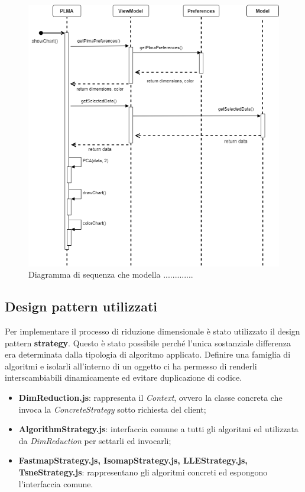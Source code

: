 \newpage
\begin{figure}[hb]
\includegraphics[width=15.5cm]{Extra/Allegato Tecnico-Sequenza-PLMA}
\centering
\caption{Diagramma di sequenza che modella .............}
\end{figure}
\newpage

\subsection{Design pattern utilizzati}
Per implementare il processo di riduzione dimensionale è stato utilizzato il design pattern \textbf{strategy}. Questo è stato possibile perché l'unica sostanziale differenza era determinata dalla tipologia di algoritmo applicato. Definire una famiglia di algoritmi e isolarli all'interno di un oggetto ci ha permesso di renderli interscambiabili dinamicamente ed evitare duplicazione di codice. 
\begin{itemize}
\item \textbf{DimReduction.js}: rappresenta il \textit{Context}, ovvero la classe concreta che invoca la \textit{ConcreteStrategy} sotto richiesta del client;
\item \textbf{AlgorithmStrategy.js}: interfaccia comune a tutti gli algoritmi ed utilizzata da \textit{DimReduction} per settarli ed invocarli;
\item \textbf{FastmapStrategy.js, IsomapStrategy.js, LLEStrategy.js, TsneStrategy.js}: rappresentano gli algoritmi concreti ed espongono l'interfaccia comune.
\end{itemize}


